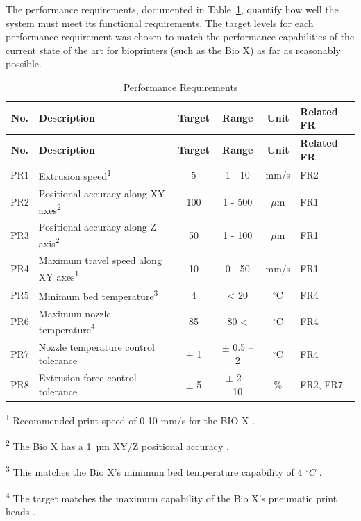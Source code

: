 The performance requirements, documented in Table~\ref{tab:performance_requirements}, quantify how well the system must meet its functional requirements. The target levels for each performance requirement was chosen to match the performance capabilities of the current state of the art for bioprinters (such as the Bio X) as far as reasonably possible.

\small
\begin{longtable}{|c|m{5.5cm}|c|c|c|m{1.5cm}|}
\caption{Performance Requirements}
\label{tab:performance_requirements} \\
\hline
\textbf{No.} & \textbf{Description} & \textbf{Target} & \textbf{Range} & \textbf{Unit} & \textbf{Related FR} \\
\hline
\endfirsthead
\hline
\textbf{No.} & \textbf{Description} & \textbf{Target} & \textbf{Range} & \textbf{Unit} & \textbf{Related FR} \\
\hline
\endhead
PR1 & Extrusion speed\textsuperscript{1} & 5 & 1 - 10 & mm/s & FR2 \\
\hline
PR2 & Positional accuracy along XY axes\textsuperscript{2} & 100 & 1 - 500 & $\mu$m
 & FR1 \\
\hline
PR3 & Positional accuracy along Z axis\textsuperscript{2} & 50 & 1 - 100 & $\mu$m
 & FR1 \\
\hline
PR4 & Maximum travel speed along XY axes\textsuperscript{1} & 10 & 0 - 50 & mm/s & FR1 \\
\hline
PR5 & Minimum bed temperature\textsuperscript{3} & 4 & < 20 & $^{\circ}$C & FR4 \\
\hline
PR6 & Maximum nozzle temperature\textsuperscript{4} & 85 & 80 < & $^{\circ}$C & FR4 \\
\hline
PR7 & Nozzle temperature control tolerance & $\pm$ 1 & $\pm$ 0.5 – 2 & $^{\circ}$C & FR4 \\
\hline
PR8 & Extrusion force control tolerance & $\pm$ 5 & $\pm$ 2 – 10 & \% & FR2, FR7 \\
\hline
\end{longtable}
{\footnotesize
\noindent\textsuperscript{1} Recommended print speed of 0-10 mm/s for the BIO X \citep{cellink_biox_manual_2023}.

\noindent\textsuperscript{2} The Bio X has a 1~µm XY/Z positional accuracy \citep{biox_brochure}.

\noindent\textsuperscript{3} This matches the Bio X's minimum bed temperature capability of 4 $^{\circ}C$ \citep{biox_brochure}.

\noindent\textsuperscript{4} The target matches the maximum capability of the Bio X's pneumatic print heads \citep{biox_brochure}.
}
